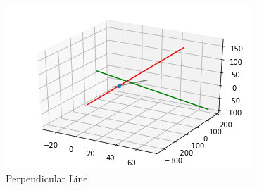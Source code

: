\documentclass[journal,12pt,twocolumn]{IEEEtran}
\begin{document}
\clearpage
\begin{figure}[!htbp]
    \centering
    \includegraphics[width =\columnwidth]{assignment1.png}
    \caption{Perpendicular Line }
    \label{fig:1}
\end{figure}
\end{document}
